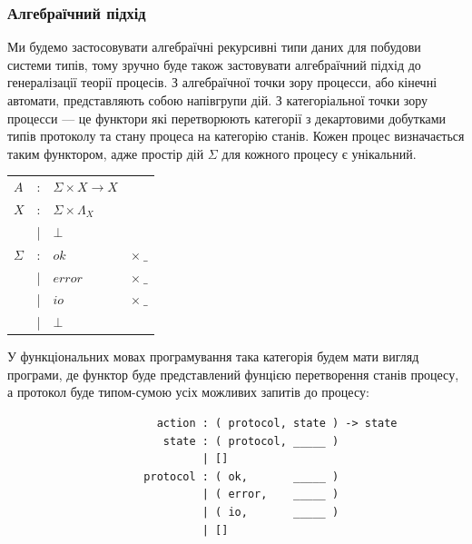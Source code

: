 \documentclass[11pt,oneside]{article}
\begin{document}
\newpage
   \subsubsection*{Алгебраїчний підхід}

   Ми будемо застосовувати алгебраїчні рекурсивні типи даних для побудови системи типів, тому
   зручно буде також застовувати алгебраїчний підхід до генералізації теорії процесів.
   З алгебраїчної точки зору процесси, або кінечні автомати, представляють собою напівгрупи дій.
   З категоріальної точки зору процесси --- це функтори які перетворюють категорії з декартовими добутками
   типів протоколу та стану процеса на категорію станів. Кожен процес визначається таким функтором, адже
   простір дій $\Sigma$ для кожного процесу є унікальний.

\begin{center}
\begin{tabular}{lcll}
$A$         &:& $\Sigma \times X \rightarrow X  $ &\\
$X$         &:& $\Sigma \times \Lambda_{X} $ &\\
            &|& $\bot                              $ &\\
$\Sigma$    &:& $ok$    & $\times\ \_$          \\
            &|& $error$ & $\times\ \_$          \\
            &|& $io$    & $\times\ \_$          \\
            &|& $\bot                              $ &\\
\end{tabular}
\end{center}

   У функціональних мовах програмування така категорія будем мати вигляд програми,
   де функтор буде представлений фунцією перетворення станів процесу, а протокол
   буде типом-сумою усіх можливих запитів до процесу:

\begin{center}
\begin{lstlisting}
                       action : ( protocol, state ) -> state
                        state : ( protocol, _____ )
                              | []
                     protocol : ( ok,       _____ )
                              | ( error,    _____ )
                              | ( io,       _____ )
                              | []
\end{lstlisting}
\end{center}
\end{document}
